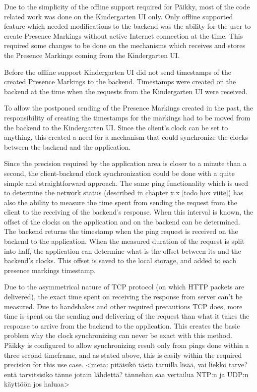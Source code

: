 Due to the simplicity of the offline support required for Päikky, most of the code related work was done on the Kindergarten UI only. Only offline supported feature which needed modifications to the backend was the ability for the user to create Presence Markings without active Internet connection at the time. This required some changes to be done on the mechanisms which receives and stores the Presence Markings coming from the Kindergarten UI. 

Before the offline support Kindergarten UI did not send timestamps of the created Presence Markings to the backend. Timestamps were created on the backend at the time when the requests from the Kindergarten UI were received. 

To allow the postponed sending of the Presence Markings created in the past, the responsibility of creating the timestamps for the markings had to be moved from the backend to the Kindergarten UI. Since the client's clock can be set to anything, this created a need for a mechanism that could synchronize the clocks between the backend and the application.

Since the precision required by the application area is closer to a minute than a second, the client-backend clock synchronization could be done with a quite simple and straightforward approach. The same ping functionality which is used to determine the network status (described in chapter x.x [todo hox viite]) has also the ability to measure the time spent from sending the request from the client to the receiving of the backend's response. When this interval is known, the offset of the clocks on the application and on the backend can be determined. The backend returns the timestamp when the ping request is received on the backend to the application. When the measured duration of the request is split into half, the application can determine what is the offset between its and the backend's clocks. This offset is saved to the local storage, and added to each presence markings timestamp. 


Due to the asymmetrical nature of TCP protocol (on which HTTP packets are delivered), the exact time spent on receiving the response from server can't be measured. Due to handshakes and other required precautions TCP does, more time is spent on the sending and delivering of the request than what it takes the response to arrive from the backend to the application. This creates the basic problem why the clock synchronizing can never be exact with this method. Päikky is configured to allow synchronizing result only from pings done within a three second timeframe, and as stated above, this is easily within the required precision for this use case. <meta: pitäisikö tästä taruilla lisää, vai liekkö tarve? entä tarvitsisiko tänne jotain lähdettä? tännehän saa vertailua NTP:n ja UDP:n käyttöön jos haluaa>

